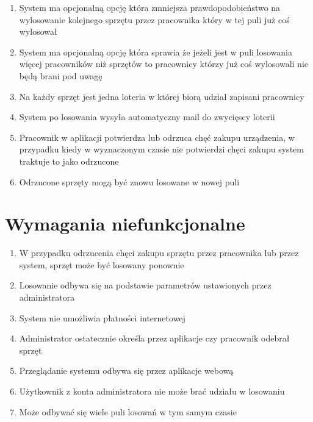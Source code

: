 \begin{enumerate}
	\item System ma opcjonalną opcję która zmniejsza prawdopodobieństwo na wylosowanie kolejnego sprzętu przez pracownika który w tej puli już coś wylosował
	\item System ma opcjonalną opcję która sprawia że jeżeli jest w puli losowania więcej pracowników niż sprzętów to pracownicy którzy już coś wylosowali nie będą brani pod uwagę
	\item Na każdy sprzęt jest jedna loteria w której biorą udział zapisani pracownicy
	\item System po losowania wysyła automatyczny mail do zwycięscy loterii
	\item Pracownik w aplikacji potwierdza lub odrzuca chęć zakupu urządzenia, w przypadku kiedy w wyznaczonym czasie nie potwierdzi chęci zakupu system traktuje to jako odrzucone
	\item Odrzucone sprzęty mogą być znowu losowane w nowej puli


\end{enumerate}


\section{Wymagania niefunkcjonalne}
\begin{enumerate}
	\item W przypadku odrzucenia chęci zakupu sprzętu przez pracownika lub przez system, sprzęt może być losowany ponownie
	\item Losowanie odbywa się na podstawie parametrów ustawionych przez administratora
	\item System nie umożliwia płatności internetowej
	\item Administrator ostatecznie określa przez aplikacje czy pracownik odebrał sprzęt
	\item Przeglądanie systemu odbywa się przez aplikacje webową
	\item Użytkownik z konta administratora nie może brać udziału w losowaniu
	\item Może odbywać się wiele puli losowań w tym samym czasie

\end{enumerate}

